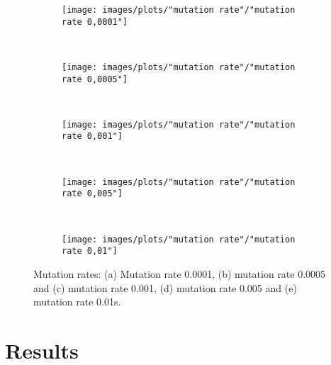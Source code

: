 \begin{figure}[h!]
    \centering
      \begin{subfigure}[b]{0.31\textwidth}
        \texttt{[image: images/plots/"mutation rate"/"mutation rate 0,0001"]}
        \caption{}
        \hfill
        \label{plot:single point crossover}
    \end{subfigure}
    ~
      \begin{subfigure}[b]{0.31\textwidth}
        \texttt{[image: images/plots/"mutation rate"/"mutation rate 0,0005"]}
        \caption{}
        \hfill
        \label{plot:single point crossover}
    \end{subfigure}
    ~
    \begin{subfigure}[b]{0.31\textwidth}
        \texttt{[image: images/plots/"mutation rate"/"mutation rate 0,001"]}
        \caption{}
        \hfill
        \label{plot:single point crossover}
    \end{subfigure}
    ~
    \begin{subfigure}[b]{0.31\textwidth}
        \texttt{[image: images/plots/"mutation rate"/"mutation rate 0,005"]}
        \caption{}
        \hfill
        \label{plot:two point crossover}
    \end{subfigure}
    ~
    \begin{subfigure}[b]{0.31\textwidth}
        \texttt{[image: images/plots/"mutation rate"/"mutation rate 0,01"]}
        \caption{}
        \hfill
        \label{plot:uniform crossover}
    \end{subfigure}
    \caption{Mutation rates: (a) Mutation rate 0.0001, (b) mutation rate 0.0005 and (c) mutation rate 0.001, (d) mutation rate 0.005 and (e) mutation rate 0.01s.}
    \label{plot:crossover methods}
\end{figure}


\section{Results}\label{section:results}


